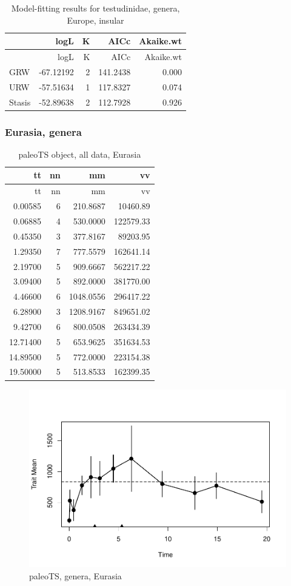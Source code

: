 \documentclass[]{article}
\begin{document}
\begin{longtable}[]{@{}lrrrr@{}}
\caption{Model-fitting results for testudinidae, genera, Europe,
insular}\tabularnewline
\toprule
& logL & K & AICc & Akaike.wt\tabularnewline
\midrule
\endfirsthead
\toprule
& logL & K & AICc & Akaike.wt\tabularnewline
\midrule
\endhead
GRW & -67.12192 & 2 & 141.2438 & 0.000\tabularnewline
URW & -57.51634 & 1 & 117.8327 & 0.074\tabularnewline
Stasis & -52.89638 & 2 & 112.7928 & 0.926\tabularnewline
\bottomrule
\end{longtable}

\newpage 

\subsubsection{Eurasia, genera}\label{eurasia-genera}

\begin{longtable}[]{@{}rrrr@{}}
\caption{paleoTS object, all data, Eurasia}\tabularnewline
\toprule
tt & nn & mm & vv\tabularnewline
\midrule
\endfirsthead
\toprule
tt & nn & mm & vv\tabularnewline
\midrule
\endhead
0.00585 & 6 & 210.8687 & 10460.89\tabularnewline
0.06885 & 4 & 530.0000 & 122579.33\tabularnewline
0.45350 & 3 & 377.8167 & 89203.95\tabularnewline
1.29350 & 7 & 777.5579 & 162641.14\tabularnewline
2.19700 & 5 & 909.6667 & 562217.22\tabularnewline
3.09400 & 5 & 892.0000 & 381770.00\tabularnewline
4.46600 & 6 & 1048.0556 & 296417.22\tabularnewline
6.28900 & 3 & 1208.9167 & 849651.02\tabularnewline
9.42700 & 6 & 800.0508 & 263434.39\tabularnewline
12.71400 & 5 & 653.9625 & 351634.53\tabularnewline
14.89500 & 5 & 772.0000 & 223154.38\tabularnewline
19.50000 & 5 & 513.8533 & 162399.35\tabularnewline
\bottomrule
\end{longtable}

\begin{figure}[htbp]
\centering
\includegraphics{MA_JJ_files/figure-latex/paleoTSEurasia-1.pdf}
\caption{paleoTS, genera, Eurasia}
\end{figure}
\end{document}
